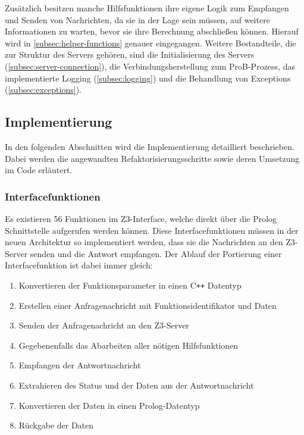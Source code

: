Zusätzlich besitzen manche Hilfsfunktionen ihre eigene Logik zum Empfangen und Senden von Nachrichten,
da sie in der Lage sein müssen, auf weitere Informationen zu warten, bevor sie ihre Berechnung abschließen können.
Hierauf wird in \cref{subsec:helper-functions} genauer eingegangen.
Weitere Bestandteile, die zur Struktur des Servers gehören, sind die Initialisierung des Servers (\cref{subsec:server-connection}), die Verbindungsherstellung zum ProB-Prozess,
das implementierte Logging (\cref{subsec:logging}) und die Behandlung von Exceptions (\cref{subsec:exceptions}).

\subsection{Implementierung}

In den folgenden Abschnitten wird die Implementierung detailliert beschrieben.
Dabei werden die angewandten Refaktorisierungsschritte sowie deren Umsetzung im Code erläutert.
\clearpage
\subsubsection{Interfacefunktionen}
Es existieren 56 Funktionen im Z3-Interface, welche direkt über die Prolog Schnittstelle aufgerufen werden können.
Diese Interfacefunktionen müssen in der neuen Architektur so implementiert werden, dass sie die Nachrichten an den Z3-Server senden und die Antwort empfangen.
Der Ablauf der Portierung einer Interfacefunktion ist dabei immer gleich:

\begin{enumerate}
  \item Konvertieren der Funktionsparameter in einen C\texttt{++} Datentyp
  \item Erstellen einer Anfragenachricht mit Funktionsidentifikator und Daten
  \item Senden der Anfragenachricht an den Z3-Server
  \item Gegebenenfalls das Abarbeiten aller nötigen Hilfsfunktionen
  \item Empfangen der Antwortnachricht
  \item Extrahieren des Status und der Daten aus der Antwortnachricht
  \item Konvertieren der Daten in einen Prolog-Datentyp
  \item Rückgabe der Daten
\end{enumerate}

